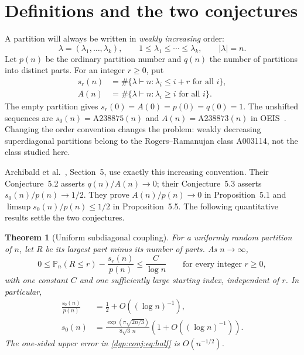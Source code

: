 \documentclass[11pt,letterpaper]{article}
\numberwithin{equation}{section}
\newtheorem{theorem}{Theorem}[section]
\theoremstyle{remark}\newtheorem{remark}[theorem]{Remark}
\newcommand{\PP}{\mathbb P}
\begin{document}
\section{Definitions and the two conjectures}\label{dgp:conj:sec:targets}
A partition will always be written in \emph{weakly increasing} order:
\[
 \lambda=(\lambda_1,\ldots,\lambda_k),\qquad
 1\leq\lambda_1\leq\cdots\leq\lambda_k,\qquad |\lambda|=n.
\]
Let $p(n)$ be the ordinary partition number and $q(n)$ the number of
partitions into distinct parts. For an integer $r\geq0$, put
\begin{align}
 s_r(n)&=\#\{\lambda\vdash n:\lambda_i\leq i+r\text{ for all }i\},\label{dgp:conj:eq:subdef}\\
 A(n)&=\#\{\lambda\vdash n:\lambda_i\geq i\text{ for all }i\}.\label{dgp:conj:eq:superdef}
\end{align}
The empty partition gives $s_r(0)=A(0)=p(0)=q(0)=1$.
The unshifted sequences are $s_0(n)=\mathrm{A238875}(n)$ and
$A(n)=\mathrm{A238873}(n)$ in OEIS~\cite{oeisA238875,oeisA238873}.
Changing the order convention changes the problem: weakly decreasing
superdiagonal partitions belong to the Rogers--Ramanujan class
A003114, not the class studied here.

Archibald et al.~\cite{abek}, Section~5, use exactly this increasing
convention. Their Conjecture~5.2 asserts $q(n)/A(n)\to0$; their
Conjecture~5.3 asserts $s_0(n)/p(n)\to1/2$. They prove
$A(n)/p(n)\to0$ in Proposition~5.1 and
$\limsup s_0(n)/p(n)\leq1/2$ in Proposition~5.5. The following
quantitative results settle the two conjectures.

\begin{theorem}[Uniform subdiagonal coupling]\label{dgp:conj:thm:coupling}
For a uniformly random partition of $n$, let $R$ be its largest part
minus its number of parts. As $n\to\infty$,
\begin{equation}\label{dgp:conj:eq:coupling}
 0\leq\PP_n(R\leq r)-\frac{s_r(n)}{p(n)}
 \leq\frac{C}{\log n}\qquad\text{for every integer }r\geq0,
\end{equation}
with one constant $C$ and one sufficiently large starting index,
independent of $r$. In particular,
\begin{align}
 \frac{s_0(n)}{p(n)}&=\frac12+O((\log n)^{-1}),\label{dgp:conj:eq:half}\\
 s_0(n)&=\frac{\exp(\pi\sqrt{2n/3})}{8\sqrt3\,n}
       \left(1+O((\log n)^{-1})\right).\label{dgp:conj:eq:subeq}
\end{align}
The one-sided upper error in \eqref{dgp:conj:eq:half} is $O(n^{-1/2})$.
\end{theorem}
\end{document}

